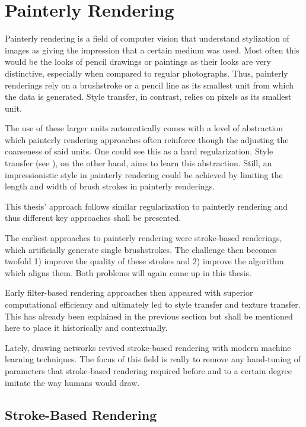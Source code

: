 \section{Painterly Rendering}


Painterly rendering is a field of computer vision that understand stylization of images as giving the impression that a certain medium was used.
Most often this would be the looks of pencil drawings or paintings as their looks are very distinctive, especially when compared to regular photographs.
Thus, painterly renderings rely on a brushstroke or a pencil line as its smallest unit from which the data is generated.
Style transfer, in contrast, relies on pixels as its smallest unit.

The use of these larger units automatically comes with a level of abstraction which painterly rendering approaches often reinforce though the adjusting the coarseness of said units.
One could see this as a hard regularization.
Style transfer (see ), on the other hand, aims to learn this abstraction.
Still, an impressionistic style in painterly rendering could be achieved by limiting the length and width of brush strokes in painterly renderings.

This thesis' approach follows similar regularization to painterly rendering and thus different key approaches shall be presented.

The earliest approaches to painterly rendering were stroke-based renderings, which artificially generate single brushstrokes.
The challenge then becomes twofold 1) improve the quality of these strokes and 2) improve the algorithm which aligns them.
Both problems will again come up in this thesis.

Early filter-based rendering approaches then appeared with superior computational efficiency and ultimately led to style transfer and texture transfer.
This has already been explained in the previous section but shall be mentioned here to place it historically and contextually.

Lately, drawing networks revived stroke-based rendering with modern machine learning techniques.
The focus of this field is really to remove any hand-tuning of parameters that stroke-based rendering required before and to a certain degree imitate the way humans would draw.

\subsection{Stroke-Based Rendering}

